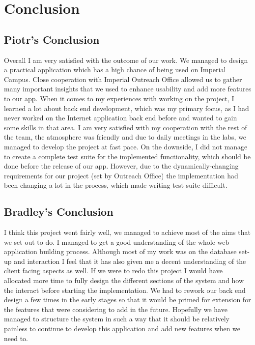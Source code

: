 \documentclass[10pt,a4paper]{article}
\begin{document}
\section{Conclusion}
 \subsection{Piotr's Conclusion}
 Overall I am very satisfied with the outcome of our work. We managed to design 
a practical application which has a high chance of being used on Imperial 
Campus. Close cooperation with Imperial Outreach Office allowed us to gather 
many important insights that we used to enhance usability and add more features 
to our app. When it comes to my experiences with working on the project, I 
learned a lot about back end development, which was my primary focus, as I had 
never worked on the Internet application back end before and wanted to gain some 
skills in that area. I am very satisfied with my cooperation with the rest of 
the team, the atmosphere was friendly and due to daily meetings in the labs, we 
managed to develop the project at fast pace. On the downside, I did not manage 
to create a complete test suite for the implemented functionality, which should 
be done before the release of our app. However, due to the dynamically-changing 
requirements for our project (set by Outreach Office) the implementation had 
been changing a lot in the process, which made writing test suite difficult. 
 
 \subsection{Bradley's Conclusion}
 I think this project went fairly well, we managed to achieve most of the aims 
that we set out to do. I managed to get a good understanding of the whole web 
application building process. Although most of my work was on the database 
set-up and interaction I feel that it has also given me a decent understanding 
of the client facing aspects as well. If we were to redo this project I would 
have allocated more time to fully design the different sections of the system 
and how the interact before starting the implementation. We had to rework our 
back end design a few times in the early stages so that it would be primed for 
extension for the features that were considering to add in the future. Hopefully 
we have managed to structure the system in such a way that it should be 
relatively painless to continue to develop this application and add new features 
when we need to.  
\end{document}

